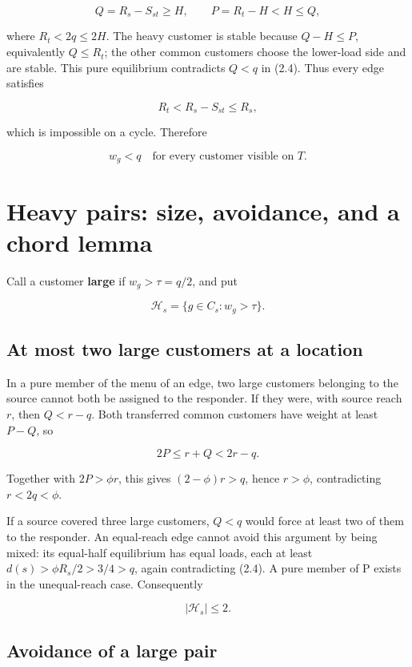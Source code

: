 \documentclass[11pt,a4paper]{article}
\begin{document}
\[
Q=R_s-S_{st}\ge H,\qquad P=R_t-H<H\le Q,
\]

where \(R_t<2q\le2H\). The heavy customer is stable because \(Q-H\le P\), equivalently \(Q\le R_t\); the other common customers choose the lower-load side and are stable. This pure equilibrium contradicts \(Q<q\) in (2.4). Thus every edge satisfies

\[
R_t<R_s-S_{st}\le R_s,
\]

which is impossible on a cycle. Therefore

\[
w_g<q\quad\text{for every customer visible on }T. \tag{4.1}
\]

\hypertarget{heavy-pairs-size-avoidance-and-a-chord-lemma}{%
\section{Heavy pairs: size, avoidance, and a chord lemma}\label{heavy-pairs-size-avoidance-and-a-chord-lemma}}

Call a customer \textbf{large} if \(w_g>\tau=q/2\), and put

\[
\mathcal H_s=\{g\in C_s:w_g>\tau\}.
\]

\hypertarget{at-most-two-large-customers-at-a-location}{%
\subsection{At most two large customers at a location}\label{at-most-two-large-customers-at-a-location}}

In a pure member of the menu of an edge, two large customers belonging to the source cannot both be assigned to the responder. If they were, with source reach \(r\), then \(Q<r-q\). Both transferred common customers have weight at least \(P-Q\), so

\[
2P\le r+Q<2r-q.
\]

Together with \(2P>\phi r\), this gives \((2-\phi)r>q\), hence \(r>\phi\), contradicting \(r<2q<\phi\).

If a source covered three large customers, \(Q<q\) would force at least two of them to the responder. An equal-reach edge cannot avoid this argument by being mixed: its equal-half equilibrium has equal loads, each at least \(d(s)>\phi R_s/2>3/4>q\), again contradicting (2.4). A pure member of P exists in the unequal-reach case. Consequently

\[
|\mathcal H_s|\le2. \tag{5.1}
\]

\hypertarget{avoidance-of-a-large-pair}{%
\subsection{Avoidance of a large pair}\label{avoidance-of-a-large-pair}}
\end{document}
